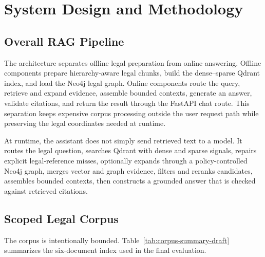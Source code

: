 \section{System Design and Methodology}

\subsection{Overall RAG Pipeline}
The architecture separates offline legal preparation from online answering. Offline components prepare hierarchy-aware legal chunks, build the dense--sparse Qdrant index, and load the Neo4j legal graph. Online components route the query, retrieve and expand evidence, assemble bounded contexts, generate an answer, validate citations, and return the result through the FastAPI chat route. This separation keeps expensive corpus processing outside the user request path while preserving the legal coordinates needed at runtime.

At runtime, the assistant does not simply send retrieved text to a model. It routes the legal question, searches Qdrant with dense and sparse signals, repairs explicit legal-reference misses, optionally expands through a policy-controlled Neo4j graph, merges vector and graph evidence, filters and reranks candidates, assembles bounded contexts, then constructs a grounded answer that is checked against retrieved citations.


\subsection{Scoped Legal Corpus}
The corpus is intentionally bounded. Table~\ref{tab:corpus-summary-draft} summarizes the six-document index used in the final evaluation.

